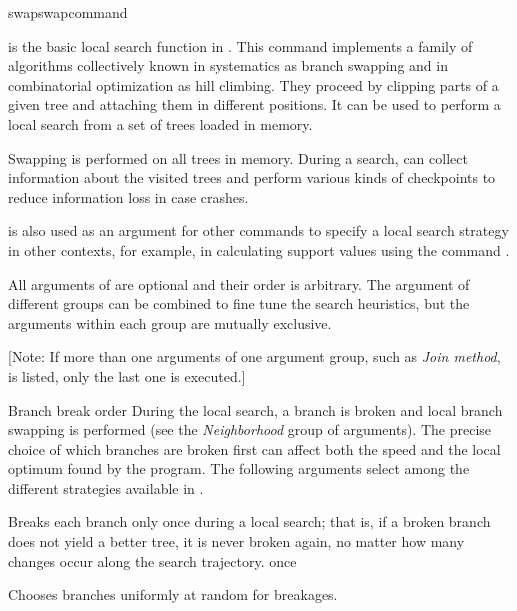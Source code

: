 \begin{command}{swap}{swapcommand}


\begin{poydescription} 
 is the basic local search function in \poy. This
command implements a family of algorithms collectively known in systematics as
branch swapping and in combinatorial optimization as hill climbing. 
They proceed by clipping parts of a given tree and
attaching them in different positions. It can be
used to perform a local search from a set of trees loaded in memory.

Swapping is performed on all trees in memory. During a search,
 can collect information about the
visited trees and perform various kinds of checkpoints to reduce
information loss in case \poy crashes.

 is also used as an argument for other
commands to specify a local search strategy in other contexts, for example,
in calculating support values using the command
.

All arguments of  are optional and their order
is arbitrary. The argument of different groups can be combined to fine tune the search 
heuristics, but the arguments within each group are mutually exclusive. 

[Note: If more than one arguments of one argument group, such as \emph {Join method}, 
is listed, only the last one is executed.]
\end{poydescription}

\begin{arguments}

\begin{argumentgroup}{Branch break order}
{During the local search, a branch is broken and local branch swapping
is performed (see the \emph{Neighborhood} group of arguments). The
precise choice of which branches are broken first can affect both 
the speed and the local optimum found by the program. The following 
arguments select among the different strategies available in \poy.}

{Breaks each branch only once during a local search; that is, if a
broken branch does not yield a better tree, it is never broken again,
no matter how many changes occur along the search trajectory.}
{once}

{Chooses branches uniformly at random for breakages.}
{}


\end{argumentgroup}
\end{arguments}
\end{command}
